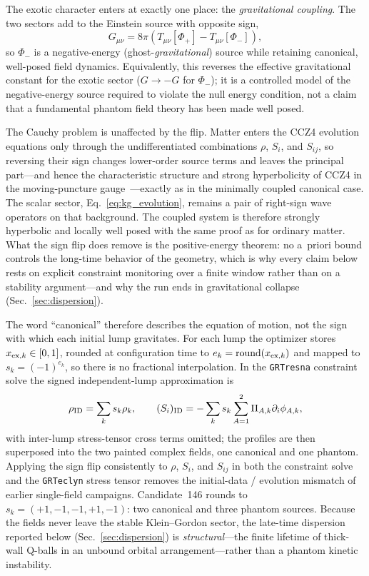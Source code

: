 \documentclass[twocolumn,floatfix,aps,prd,nofootinbib]{revtex4-2}
\begin{document}
The exotic character enters at exactly one place: the \emph{gravitational
coupling}. The two sectors add to the Einstein source with opposite sign,
\begin{equation}
G_{\mu\nu}=8\pi\left(T_{\mu\nu}[\Phi_{+}]-T_{\mu\nu}[\Phi_{-}]\right),
\label{eq:bicomplex_source}
\end{equation}
so $\Phi_{-}$ is a negative-energy (ghost-\emph{gravitational}) source while
retaining canonical, well-posed field dynamics. Equivalently, this reverses
the effective gravitational constant for the exotic sector ($G\to-G$ for
$\Phi_{-}$); it is a controlled model of the negative-energy source required to
violate the null energy condition, not a claim that a fundamental phantom
field theory has been made well posed.

The Cauchy problem is unaffected by the flip. Matter enters the CCZ4 evolution
equations only through the undifferentiated combinations $\rho$, $S_i$, and
$S_{ij}$, so reversing their sign changes lower-order source terms and leaves
the principal part---and hence the characteristic structure and strong
hyperbolicity of CCZ4 in the moving-puncture gauge~\cite{alic12}---exactly as
in the minimally coupled canonical case. The scalar sector,
Eq.~\eqref{eq:kg_evolution}, remains a pair of right-sign wave operators on
that background. The coupled system is therefore strongly hyperbolic and
locally well posed with the same proof as for ordinary matter. What the sign
flip does remove is the positive-energy theorem: no a~priori bound controls the
long-time behavior of the geometry, which is why every claim below rests on
explicit constraint monitoring over a finite window rather than on a stability
argument---and why the run ends in gravitational collapse
(Sec.~\ref{sec:dispersion}).

The word ``canonical'' therefore describes the equation of motion, not the sign
with which each initial lump gravitates. For each lump the optimizer stores
$x_{{\rm ex},k}\in[0,1]$, rounded at configuration time to
$e_k=\operatorname{round}(x_{{\rm ex},k})$ and mapped to $s_k=(-1)^{e_k}$, so
there is no fractional interpolation. In the \texttt{GRTresna} constraint solve
the signed independent-lump approximation is
\begin{equation}
\rho_{\rm ID}=\sum_k s_k\rho_k,\qquad
(S_i)_{\rm ID}=-\sum_k s_k\sum_{A=1}^{2}
\Pi_{A,k}\partial_i\phi_{A,k},
\label{eq:signed_sources}
\end{equation}
with inter-lump stress-tensor cross terms omitted; the profiles are then
superposed into the two painted complex fields, one canonical and one phantom.
Applying the sign flip consistently to $\rho$, $S_i$, and $S_{ij}$ in both the
constraint solve and the \texttt{GRTeclyn} stress tensor removes the
initial-data / evolution mismatch of earlier single-field campaigns.
Candidate~146 rounds to $s_k=(+1,-1,-1,+1,-1)$: two canonical and three phantom
sources. Because the fields never leave the stable Klein--Gordon sector, the
late-time dispersion reported below (Sec.~\ref{sec:dispersion}) is
\emph{structural}---the finite lifetime of thick-wall Q-balls in an unbound
orbital arrangement---rather than a phantom kinetic instability.
\end{document}
